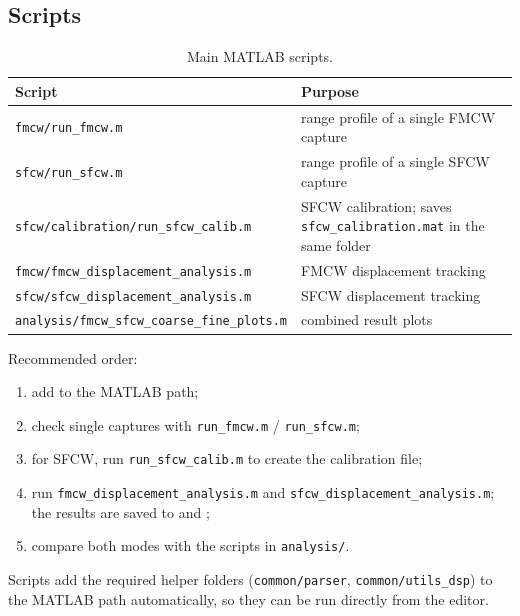 \documentclass[12pt, a4paper]{article}
\begin{document}
\subsection{Scripts}

\begin{table}[H]
\centering
\begin{tabularx}{\textwidth}{|l|X|}
\hline
\textbf{Script} & \textbf{Purpose} \\
\hline
\texttt{fmcw/run\_fmcw.m} & range profile of a single FMCW capture \\
\hline
\texttt{sfcw/run\_sfcw.m} & range profile of a single SFCW capture \\
\hline
\texttt{sfcw/calibration/run\_sfcw\_calib.m} & SFCW calibration; saves \texttt{sfcw\_calibration.mat} in the same folder \\
\hline
\texttt{fmcw/fmcw\_displacement\_analysis.m} & FMCW displacement tracking  \\
\hline
\texttt{sfcw/sfcw\_displacement\_analysis.m} & SFCW displacement tracking  \\
\hline
\texttt{analysis/fmcw\_sfcw\_coarse\_fine\_plots.m} & combined result plots \\
\hline
\end{tabularx}
\caption{Main MATLAB scripts.}
\end{table}

Recommended order:
\begin{enumerate}
\item add  to the MATLAB path;
\item check single captures with \texttt{run\_fmcw.m} / \texttt{run\_sfcw.m};
\item for SFCW, run \texttt{run\_sfcw\_calib.m} to create the calibration file;
\item run \texttt{fmcw\_displacement\_analysis.m} and \texttt{sfcw\_displacement\_analysis.m};
      the results are saved to  and
      ;
\item compare both modes with the scripts in \texttt{analysis/}.
\end{enumerate}

Scripts add the required helper folders (\texttt{common/parser}, \texttt{common/utils\_dsp})
to the MATLAB path automatically, so they can be run directly from the editor.
\end{document}
